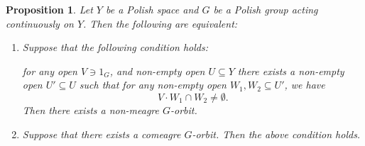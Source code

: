 \documentclass[12pt]{amsart}
\numberwithin{equation}{section}
\theoremstyle{plain}
\newtheorem{proposition}[theorem]{\bf Proposition}
\theoremstyle{definition}
\begin{document}
\begin{proposition}
	\label{pr:Criterion}
	Let $Y$ be a Polish space and $G$ be a Polish group acting continuously on $Y$. Then the following are equivalent:
	\begin{enumerate}
		\item Suppose that the following condition holds:
		
		\medskip
		
		\noindent for any open $V \ni 1_G$, and non-empty open $U \subseteq Y$ there exists a non-empty open $U' \subseteq U$ such that for any non-empty open $W_1, W_2 \subseteq U'$, we have
		\[
		V \cdot W_1 \cap W_2 \neq \emptyset.
		\]
		\medskip
		Then there exists a non-meagre $G$-orbit.
		\item Suppose that there exists a comeagre $G$-orbit. Then the above condition holds.
	\end{enumerate}
\end{proposition}
\end{document}
